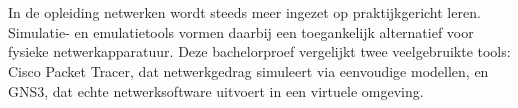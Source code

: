 
%
%
%
%
%

%



\chapter*{}

In de opleiding netwerken wordt steeds meer ingezet op praktijkgericht leren. Simulatie- en emulatietools vormen daarbij een toegankelijk alternatief voor fysieke netwerkapparatuur. Deze bachelorproef vergelijkt twee veelgebruikte tools: Cisco Packet Tracer, dat netwerkgedrag simuleert via eenvoudige modellen, en GNS3, dat echte netwerksoftware uitvoert in een virtuele omgeving.

